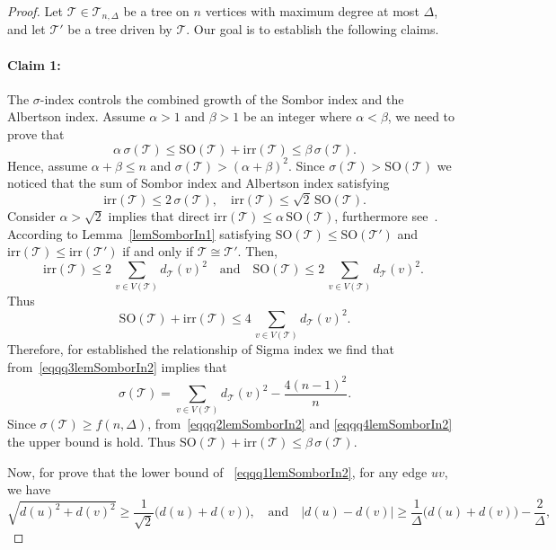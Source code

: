 \documentclass[12pt, a4paper]{article}
\newcommand{\claim}[1]{\paragraph*{Claim #1:}}
\newcommand{\TT}{\mathcal{T}}
\newcommand{\irr}{\mathrm{irr}}
\begin{document}
\begin{proof}
Let $\TT \in \TT_{n,\Delta}$ be a tree on $n$ vertices with maximum degree at most $\Delta$, and let $\TT'$ be a tree driven by $\TT$. Our goal is to establish the following claims.
\claim{1} The $\sigma$-index controls the combined growth of the Sombor index and the Albertson index. Assume $\alpha>1$ and $\beta>1$ be an integer where $\alpha<\beta$, we need to prove that 
\begin{equation}~\label{eqqq1lemSomborIn2}
\alpha\,\sigma(\TT)\leqslant \mathrm{SO}(\TT)+\irr(\TT)\leqslant \beta\, \sigma(\TT).
\end{equation}
Hence, assume $\alpha+\beta\leqslant n$ and $\sigma(\TT)>(\alpha+\beta)^2$. Since $\sigma(\TT)>\mathrm{SO}(\TT)$ we noticed that the sum of Sombor index and Albertson index satisfying 
\begin{equation}~\label{eqqq2lemSomborIn2}
\irr(\TT)\leqslant 2\,\sigma(\TT), \quad \irr(\TT)\leqslant \sqrt{2}\,\mathrm{SO}(\TT).
\end{equation}
Consider $\alpha>\sqrt{2}$ implies that direct $\irr(\TT)\leqslant \alpha\,\mathrm{SO}(\TT)$, furthermore see~\cite{Liu2022GutmanYou, Liu2023GutmanYou}. According to Lemma~\ref{lemSomborIn1} satisfying $\mathrm{SO}(\TT)\leqslant \mathrm{SO}(\TT')$ and $\irr(\TT)\leqslant \irr(\TT')$ if and only if $\TT\cong \TT'$.  Then, 
\[
\irr(\TT)\leqslant 2\,\sum_{v\in V(\TT)}d_\TT(v)^2\quad \text{and} \quad  \mathrm{SO}(\TT)\leqslant 2\,\sum_{v\in V(\TT)}d_\TT(v)^2.
\]
Thus
\begin{equation}~\label{eqqq3lemSomborIn2}
\mathrm{SO}(\TT)+\irr(\TT)\leqslant 4\, \sum_{v\in V(\TT)}d_\TT(v)^2.    
\end{equation}
Therefore, for established the relationship of Sigma index we find that from~\eqref{eqqq3lemSomborIn2} implies that
\begin{equation}~\label{eqqq4lemSomborIn2}
\sigma(\TT)=\sum_{v\in V(\TT)}d_\TT(v)^2-\frac{4(n-1)^2}{n}.
\end{equation}
Since $\sigma(\TT)\geqslant f(n,\Delta)$, from~\eqref{eqqq2lemSomborIn2} and \eqref{eqqq4lemSomborIn2} the upper bound is hold. Thus $ \mathrm{SO}(\TT)+\irr(\TT)\leqslant \beta\, \sigma(\TT).$

Now, for prove that the lower bound of ~\eqref{eqqq1lemSomborIn2}, for any edge $uv$, we have
$$
\sqrt{d(u)^2+d(v)^2}\geqslant \frac{1}{\sqrt{2}} \bigl(d(u)+d(v)\bigr), \quad \text{and}\quad \bigl|d(u)-d(v)\bigr|\geqslant \frac{1}{\Delta} \bigl(d(u)+d(v)\bigr)-\frac{2}{\Delta},
$$


\end{proof}
\end{document}
